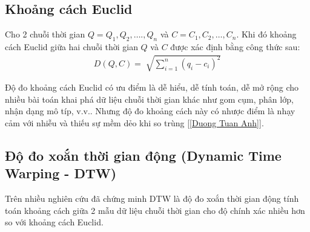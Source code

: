\documentclass[13pt,oneside]{scrbook}
\begin{document}
\subsection{Khoảng cách Euclid}
Cho 2 chuỗi thời gian $Q = Q_1, Q_2,…., Q_n$ và $C = C_1, C_2, …, C_n$.
Khi đó khoảng cách Euclid giữa hai chuỗi thời gian $Q$ và $C$ được xác định bằng công thức sau:
\begin{align}
D\left( {Q, C} \right) = \sqrt[{}]{{\mathop \sum \limits_{i = 1}^n {{\left( {{q_i} - {c_i}} \right)}^2}}}
\end{align}

Độ đo khoảng cách Euclid có ưu điểm là dễ hiểu, dễ tính toán, dễ mở rộng cho nhiều bài toán khai phá dữ liệu chuỗi thời gian khác như gom cụm, phân lớp, nhận dạng mô típ, v.v.. 
Nhưng độ đo khoảng cách này có nhược điểm là nhạy cảm với nhiễu và thiếu sự mềm dẻo khi so trùng [\ref{Duong Tuan Anh}].
\subsection{Độ đo xoắn thời gian động (Dynamic Time Warping - DTW)}
Trên nhiều nghiên cứu đã chứng minh DTW là độ đo xoắn thời gian động tính toán khoảng cách giữa 2 mẫu dữ liệu chuỗi thời gian cho độ chính xác nhiều hơn so với khoảng cách Euclid. 
\end{document}
